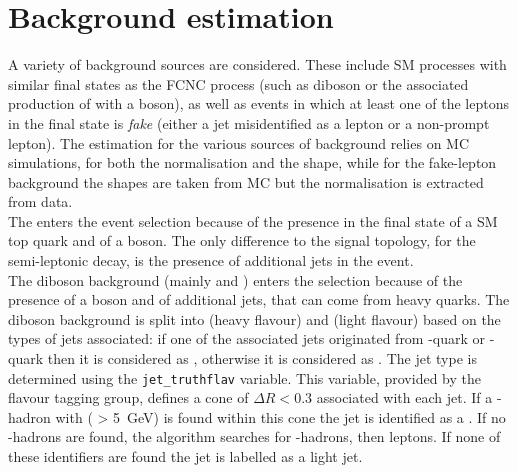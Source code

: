 \section{Background estimation}
\label{sec:background}
A variety of background sources are considered.
These include SM processes with similar final states as the FCNC \tZc
process (such as diboson or the associated production of \ttbar with
a \PZ boson), as well as events in which at least one of the leptons
in the final state is \textit{fake} (either a jet misidentified as a
lepton or a non-prompt lepton).
The estimation for the various sources of background relies on MC
simulations, for both the normalisation and the shape, while for the
\ttbar fake-lepton background the shapes are taken from MC but the
normalisation is extracted from data. \\
The \ttZ enters the event selection because of the presence in the
final state of a SM top quark and of a \PZ boson. The only difference
to the signal topology, for the semi-leptonic \ttbar decay, is the
presence of additional jets in the event. \\
The diboson background (mainly \PW\PZ and \PZ\PZ) enters the selection because of the presence
of a \PZ boson and of additional jets, that can come from heavy
quarks. 
The diboson background is split into \VVHF (heavy flavour) and \VVLF (light flavour) based on the types of jets associated:
if one of the associated jets originated from \Pqb-quark or \Pqc-quark then it is considered as \VVHF, otherwise it is considered as \VVLF. %
The jet type is determined using the \texttt{jet\_truthflav} variable.
This variable, provided by the flavour tagging group, defines a cone of $\Delta R < 0.3$ associated with each jet.
If a \Pqb-hadron with ( \pT > \SI{5}{\GeV}) is found within this cone the jet is identified as a \bjet.
If no \Pqb-hadrons are found, the algorithm searches for \Pqc-hadrons, then \Pgt leptons.
If none of these identifiers are found the jet is labelled as a light jet.\\

